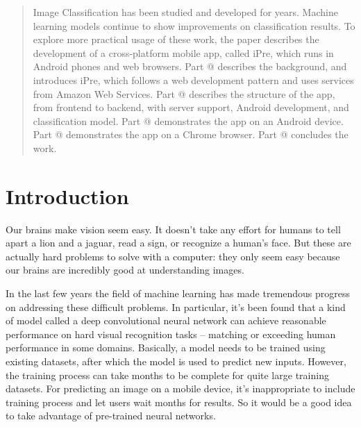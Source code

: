 \documentclass[conference]{IEEEtran}
\makeatletter
\newcommand*{\rom}[1]{\expandafter\@slowromancap\romannumeral #1@}
\makeatother
\begin{document}
\begin{abstract}
Image Classification has been studied and developed for years. Machine learning models continue to show improvements on classification results. To explore more practical usage of these work, the paper describes the development of a cross-platform mobile app, called iPre, which runs in Android phones and web browsers. Part \rom{1} describes the background, and introduces iPre, which follows a web development pattern and uses services from Amazon Web Services. Part \rom{2} describes the structure of the app, from frontend to backend, with server support, Android development, and classification model. Part \rom{3} demonstrates the app on an Android device. Part \rom{4} demonstrates the app on a Chrome browser. Part \rom{5} concludes the work.
\end{abstract}





%
\IEEEpeerreviewmaketitle



\section{Introduction}
Our brains make vision seem easy. It doesn't take any effort for humans to tell apart a lion and a jaguar, read a sign, or recognize a human's face. But these are actually hard problems to solve with a computer: they only seem easy because our brains are incredibly good at understanding images.

In the last few years the field of machine learning has made tremendous progress on addressing these difficult problems. In particular, it's been found that a kind of model called a deep convolutional neural network can achieve reasonable performance on hard visual recognition tasks -- matching or exceeding human performance in some domains. Basically, a model needs to be trained using existing datasets, after which the model is used to predict new inputs. However, the training process can take months to be complete for quite large training datasets. For predicting an image on a mobile device, it's inappropriate to include training process and let users wait months for results. So it would be a good idea to take advantage of pre-trained neural networks.
\end{document}
